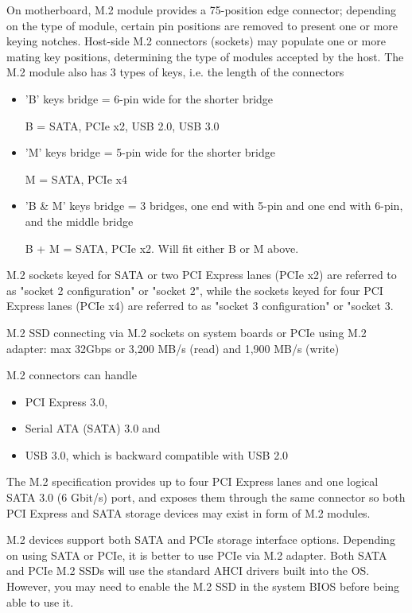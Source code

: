 On motherboard, M.2 module provides a 75-position edge connector; depending on
the type of module, certain pin positions are removed to present one or more
keying notches. Host-side M.2 connectors (sockets) may populate one or more
mating key positions, determining the type of modules accepted by the host. The
M.2 module also has 3 types of keys, i.e. the length of the connectors
\begin{itemize}
  \item 'B' keys bridge = 6-pin wide for the shorter bridge

B =  SATA, PCIe x2, USB 2.0, USB 3.0
  
  \item 'M' keys bridge = 5-pin wide for the shorter bridge

M = SATA, PCIe x4 
  
  \item 'B \& M' keys bridge = 3 bridges, one end with 5-pin and one end with
  6-pin, and the middle bridge

B + M = SATA, PCIe x2. Will fit either B or M above.

\end{itemize}


M.2 sockets keyed for SATA or two PCI Express lanes (PCIe x2) are referred to as
"socket 2 configuration" or "socket 2", while the sockets keyed for four PCI
Express lanes (PCIe x4) are referred to as "socket 3 configuration" or "socket
3.   

M.2 SSD connecting via  M.2 sockets on system boards or PCIe using M.2
adapter:  max 32Gbps or 3,200 MB/s (read) and 1,900 MB/s (write)

 
M.2 connectors can handle
\begin{itemize}
  \item PCI Express 3.0, 
  
  \item Serial ATA (SATA) 3.0 and 
  
  \item USB 3.0, which is backward compatible with USB 2.0
\end{itemize} 

The M.2 specification provides up to four PCI Express lanes and one logical
SATA 3.0 (6 Gbit/s) port, and exposes them through the same connector so both
PCI Express and SATA storage devices may exist in form of M.2 modules.  


M.2 devices support both SATA and PCIe storage interface options.
Depending on using SATA or PCIe, it is better to use PCIe via M.2 adapter. 
Both SATA and PCIe M.2 SSDs will use the standard AHCI drivers built into the
OS. However, you may need to enable the M.2 SSD in the system BIOS before being
able to use it. 
  
